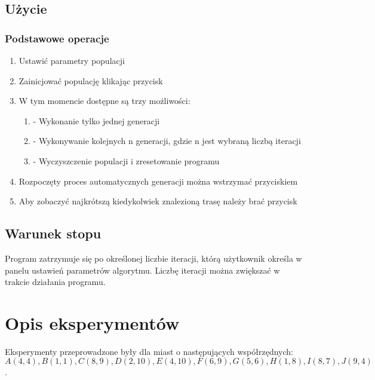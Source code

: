 \documentclass[a4paper,11pt]{article}
\begin{document}
		\subsection{Użycie}
			\subsubsection{Podstawowe operacje}
				\begin{enumerate}
					\item Ustawić parametry populacji
					\item Zainicjować populację klikając przycisk 
					\item W tym momencie dostępne są trzy możliwości:
					\begin{enumerate}
						\item {} - Wykonanie tylko jednej generacji
						\item {} - Wykonywanie kolejnych n generacji, gdzie n jest wybraną liczbą iteracji
						\item {} - Wyczyszczenie populacji i zresetowanie programu
					\end{enumerate}
					\item Rozpoczęty proces automatycznych generacji można wstrzymać przyciskiem 
					\item Aby zobaczyć najkrótszą kiedykolwiek znalezioną trasę należy brać przycisk 
				\end{enumerate}
			
		\subsection{Warunek stopu}
		Program zatrzymuje się po określonej liczbie iteracji, którą użytkownik określa w panelu ustawień parametrów algorytmu. Liczbę iteracji można zwiększać w trakcie działania programu.
		
	\section{Opis eksperymentów}
	Eksperymenty przeprowadzone były dla miast o następujących współrzędnych:  $$A(4,4), B(1,1), C(8,9), D(2,10), E(4,10), F(6,9), G(5,6), H(1,8), I(8,7), J(9,4)$$.
	
\end{document}
